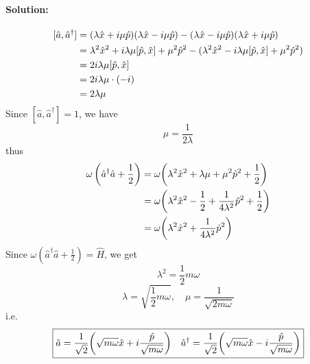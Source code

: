 \documentclass[a4paper]{article}
\numberwithin{equation}{section}
\begin{document}
\paragraph{Solution:}
\begin{align}\label{key}
	 [\hat a, \hat a^\dagger] &= (\lambda \hat x + i\mu \hat p)(\lambda \hat x - i\mu \hat p) - (\lambda \hat x - i\mu \hat p)(\lambda \hat x + i\mu \hat p) \notag\\
	 &= \lambda^2 \hat x^2 + i\lambda\mu[\hat p , \hat x] + \mu^2 \hat p^2 - (\lambda^2 \hat x^2 - i\lambda\mu[\hat p , \hat x] + \mu^2 \hat p^2 ) \notag\\
	 &= 2i\lambda\mu[\hat p , \hat x] \notag\\
	 &= 2i\lambda\mu \cdot (-i) \notag\\
	 &= 2\lambda\mu
\end{align}
Since $ [\hat a, \hat a^\dagger] = 1$, we have
\begin{equation}\label{key}
	\mu = \dfrac{1}{2\lambda}
\end{equation}
thus
\begin{align}
	\omega \left(\hat a^\dagger \hat a + \frac{1}{2}\right) &= \omega \qty(\lambda^2 \hat x^2 + \lambda\mu + \mu^2 \hat p^2 + \frac{1}{2}) \notag\\
	&= \omega \qty(\lambda^2 \hat x^2 -\dfrac{1}{2} + \dfrac{1}{4\lambda^2} \hat p^2 + \frac{1}{2}) \notag\\
	&= \omega \qty(\lambda^2 \hat x^2  + \dfrac{1}{4\lambda^2} \hat p^2)
\end{align}
Since $ \omega \left(\hat a^\dagger \hat a + \frac{1}{2}\right) = \hat H $, we get
\begin{equation}\label{key}
	\lambda^2 = \dfrac{1}{2}m\omega
\end{equation}
\begin{equation}\label{key}
	\lambda = \sqrt{\dfrac{1}{2}m\omega} , \quad \mu = \dfrac{1}{\sqrt{2m\omega} }
\end{equation}
i.e.
\begin{equation}\label{key}
	\boxed{
	\hat a = \dfrac{1}{\sqrt{2}}\qty(\sqrt{m\omega}\hat x + i\dfrac{\hat p}{\sqrt{m\omega}}) \quad 
	\hat a^\dagger = \dfrac{1}{\sqrt{2}}\qty(\sqrt{m\omega}\hat x - i\dfrac{\hat p}{\sqrt{m\omega}})
}
\end{equation}
\end{document}
